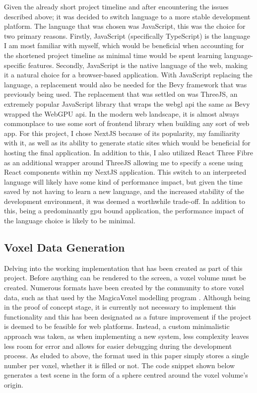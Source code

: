 \documentclass[titlepage]{article}
\begin{document}
Given the already short project timeline and after encountering the issues described above; it was decided to switch language to a more stable development platform. The language that was chosen was JavaScript, this was the choice for two primary reasons. Firstly, JavaScript (specifically TypeScript) is the language I am most familiar with myself, which would be beneficial when accounting for the shortened project timeline as minimal time would be spent learning language-specific features. Secondly, JavaScript is the native language of the web, making it a natural choice for a browser-based application. With JavaScript replacing the language, a replacement would also be needed for the Bevy framework that was previously being used. The replacement that was settled on was ThreeJS, an extremely popular JavaScript library that wraps the \gls{webgl} \gls{api} the same as Bevy wrapped the WebGPU \gls{api}. In the modern web landscape, it is almost always commonplace to use some sort of frontend library when building any sort of web app. For this project, I chose NextJS because of its popularity, my familiarity with it, as well as its ability to generate static sites which would be beneficial for hosting the final application. In addition to this, I also utilized React Three Fibre as an additional wrapper around ThreeJS allowing me to specify a scene using React components within my NextJS application. This switch to an interpreted language will likely have some kind of performance impact, but given the time saved by not having to learn a new language, and the increased stability of the development environment, it was deemed a worthwhile trade-off. In addition to this, being a predominantly \gls{gpu} bound application, the performance impact of the language choice is likely to be minimal.

\subsection{Voxel Data Generation}

Delving into the working implementation that has been created as part of this project. Before anything can be rendered to the screen, a voxel volume must be created. Numerous formats have been created by the community to store voxel data, such as that used by the MagicaVoxel modelling program \cite{magicavoxel}. Although being in the proof of concept stage, it is currently not necessary to implement this functionality and this has been designated as a future improvement if the project is deemed to be feasible for web platforms. Instead, a custom minimalistic approach was taken, as when implementing a new system, less complexity leaves less room for error and allows for easier debugging during the development process. As eluded to above, the format used in this paper simply stores a single number per voxel, whether it is filled or not. The code snippet shown below generates a test scene in the form of a sphere centred around the voxel volume's origin.
\end{document}
